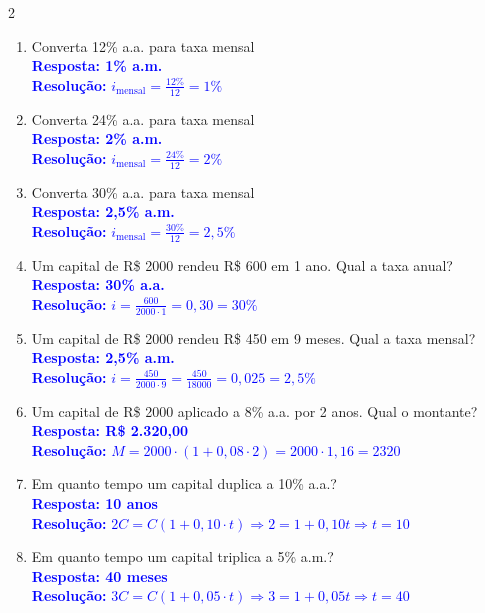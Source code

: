 \documentclass[11pt]{article}
\begin{document}
\begin{multicols}{2}
\begin{enumerate}[leftmargin=*, itemsep=2pt]
\item Converta 12\% a.a. para taxa mensal \\
\textcolor{blue}{\textbf{Resposta: 1\% a.m.}} \\
\textcolor{blue}{\textbf{Resolução:} $i_{\text{mensal}} = \frac{12\%}{12} = 1\%$}

\item Converta 24\% a.a. para taxa mensal \\
\textcolor{blue}{\textbf{Resposta: 2\% a.m.}} \\
\textcolor{blue}{\textbf{Resolução:} $i_{\text{mensal}} = \frac{24\%}{12} = 2\%$}

\item Converta 30\% a.a. para taxa mensal \\
\textcolor{blue}{\textbf{Resposta: 2,5\% a.m.}} \\
\textcolor{blue}{\textbf{Resolução:} $i_{\text{mensal}} = \frac{30\%}{12} = 2,5\%$}

\item Um capital de R\$ 2000 rendeu R\$ 600 em 1 ano. Qual a taxa anual? \\
\textcolor{blue}{\textbf{Resposta: 30\% a.a.}} \\
\textcolor{blue}{\textbf{Resolução:} $i = \frac{600}{2000 \cdot 1} = 0,30 = 30\%$}

\item Um capital de R\$ 2000 rendeu R\$ 450 em 9 meses. Qual a taxa mensal? \\
\textcolor{blue}{\textbf{Resposta: 2,5\% a.m.}} \\
\textcolor{blue}{\textbf{Resolução:} $i = \frac{450}{2000 \cdot 9} = \frac{450}{18000} = 0,025 = 2,5\%$}

\item Um capital de R\$ 2000 aplicado a 8\% a.a. por 2 anos. Qual o montante? \\
\textcolor{blue}{\textbf{Resposta: R\$ 2.320,00}} \\
\textcolor{blue}{\textbf{Resolução:} $M = 2000 \cdot (1 + 0,08 \cdot 2) = 2000 \cdot 1,16 = 2320$}

\item Em quanto tempo um capital duplica a 10\% a.a.? \\
\textcolor{blue}{\textbf{Resposta: 10 anos}} \\
\textcolor{blue}{\textbf{Resolução:} $2C = C(1 + 0,10 \cdot t) \Rightarrow 2 = 1 + 0,10t \Rightarrow t = 10$}

\item Em quanto tempo um capital triplica a 5\% a.m.? \\
\textcolor{blue}{\textbf{Resposta: 40 meses}} \\
\textcolor{blue}{\textbf{Resolução:} $3C = C(1 + 0,05 \cdot t) \Rightarrow 3 = 1 + 0,05t \Rightarrow t = 40$}


\end{enumerate}
\end{multicols}
\end{document}
